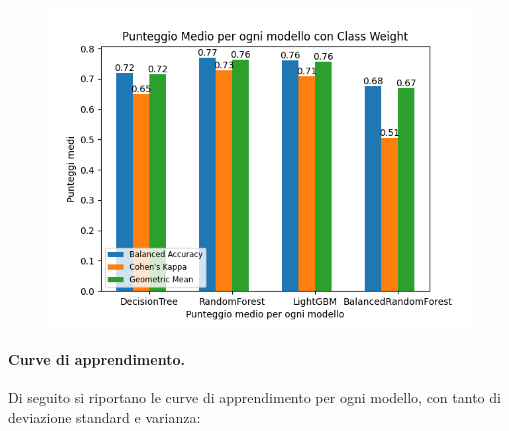 \begin{figure}[H]
    \centering
    \includegraphics[scale=0.7]{img/cw_metrics.png}
\end{figure}



\paragraph{Curve di apprendimento.} Di seguito si riportano le curve di apprendimento per ogni modello, con tanto di deviazione standard e varianza:

